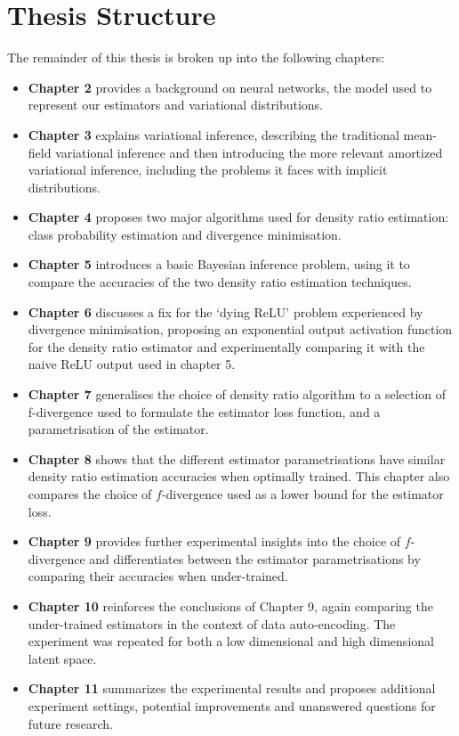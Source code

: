 \documentclass[honours,12pt]{unswthesis}
\numberwithin{equation}{section}
\theoremstyle{definition}
\begin{document}
\section{Thesis Structure}
The remainder of this thesis is broken up into the following chapters:
\begin{itemize}
\item \textbf{Chapter 2} provides a background on neural networks, the model used to represent our estimators and variational distributions.
\item \textbf{Chapter 3} explains variational inference, describing the traditional mean-field variational inference and then introducing the more relevant amortized variational inference, including the problems it faces with implicit distributions.
\item \textbf{Chapter 4} proposes two major algorithms used for density ratio estimation: class probability estimation and divergence minimisation.
\item \textbf{Chapter 5} introduces a basic Bayesian inference problem, using it to compare the accuracies of the two density ratio estimation techniques.
\item \textbf{Chapter 6} discusses a fix for the `dying ReLU' problem experienced by divergence minimisation, proposing an exponential output activation function for the density ratio estimator and experimentally comparing it with the naive ReLU output used in chapter 5.
\item \textbf{Chapter 7} generalises the choice of density ratio algorithm to a selection of f-divergence used to formulate the estimator loss function, and a parametrisation of the estimator.
\item \textbf{Chapter 8} shows that the different estimator parametrisations have similar density ratio estimation accuracies when optimally trained. This chapter also compares the choice of $f$-divergence used as a lower bound for the estimator loss.
\item \textbf{Chapter 9} provides further experimental insights into the choice of $f$-divergence and differentiates between the estimator parametrisations by comparing their accuracies when under-trained.
\item \textbf{Chapter 10} reinforces the conclusions of Chapter 9, again comparing the under-trained estimators in the context of data auto-encoding. The experiment was repeated for both a low dimensional and high dimensional latent space.
\item \textbf{Chapter 11} summarizes the experimental results and proposes additional experiment settings, potential improvements and unanswered questions for future research.
\end{itemize}
\end{document}
